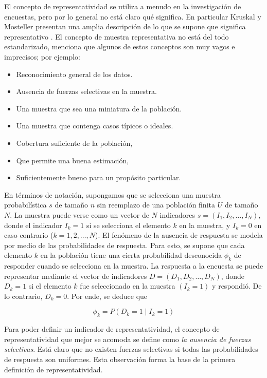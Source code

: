 \documentclass[
  10pt,
  spanish,
]{book}
\providecommand{\tightlist}{%
  \setlength{\itemsep}{0pt}\setlength{\parskip}{0pt}}
\begin{document}
El concepto de representatividad se utiliza a menudo en la investigación
de encuestas, pero por lo general no está claro qué significa. En particular Kruskal y Mosteller presentan una amplia descripción
de lo que se supone que significa representativo \citep[\citet{KruskalMosteller2}, \citet{KruskalMosteller3}, \citet{KruskalMosteller4}]{KruskalMosteller1}. El concepto de muestra representativa no está del todo estandarizado, \citet{Bethlehem_Cobben_Schouten_2009} menciona que algunos de estos conceptos son muy vagos e imprecisos; por ejemplo:

\begin{itemize}
\tightlist
\item
  Reconocimiento general de los datos.
\item
  Ausencia de fuerzas selectivas en la muestra.
\item
  Una muestra que sea una miniatura de la población.
\item
  Una muestra que contenga casos típicos o ideales.
\item
  Cobertura suficiente de la población,
\item
  Que permite una buena estimación,
\item
  Suficientemente bueno para un propósito particular.
\end{itemize}

En términos de notación, supongamos que se selecciona una muestra probabilística \(s\) de tamaño \(n\) sin reemplazo de una población finita \(U\) de tamaño \(N\). La muestra puede verse como un vector de \(N\) indicadores \(s=(I_{1},I_{2},\ldots,I_{N})\), donde el indicador \(I_{k}=1\) si se selecciona el elemento \(k\) en la muestra, y \(I_{k}=0\) en caso contrario (\(k=1,2,\ldots,N\)). El fenómeno de la ausencia de respuesta se modela por medio de las probabilidades de respuesta. Para esto, se supone que cada elemento \(k\) en la población tiene una cierta probabilidad desconocida \(\phi_{k}\) de responder cuando se selecciona en la muestra. La respuesta a la encuesta se puede representar mediante el vector de indicadores \(D=(D_{1},D_{2},\ldots,D_{N})\), donde \(D_{k}=1\) si el elemento \(k\) fue seleccionado en la muestra \((I_{k}=1)\) y respondió. De lo contrario, \(D_{k}=0\). Por ende, se deduce que

\[
\phi_{k}=P\left(D_{k}=1\mid I_{k}=1\right)
\]

Para poder definir un indicador de representatividad, el concepto
de representatividad que mejor se acomoda se define como \emph{la ausencia de fuerzas selectivas}. Está claro que no existen fuerzas selectivas si todas las probabilidades de respuesta son uniformes. Esta observación forma la base de la primera definición de representatividad.
\end{document}
